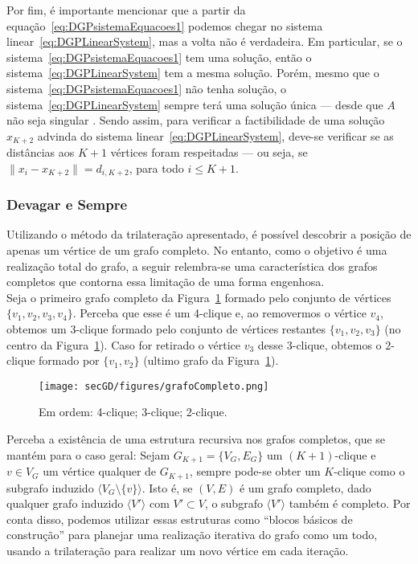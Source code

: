 Por fim, é importante mencionar que a partir da equação~\ref{eq:DGPsistemaEquacoes1} podemos chegar no sistema linear~\ref{eq:DGPLinearSystem}, mas a volta não é verdadeira. Em particular, se o sistema~\ref{eq:DGPsistemaEquacoes1} tem uma solução, então o sistema~\ref{eq:DGPLinearSystem} tem a mesma solução. Porém, mesmo que o sistema~\ref{eq:DGPsistemaEquacoes1} não tenha solução, o sistema~\ref{eq:DGPLinearSystem} sempre terá uma solução única --- desde que $A$ não seja singular \cite{libertiEDG}. Sendo assim, para verificar a factibilidade de uma solução $x_{K+2}$ advinda do sistema linear~\ref{eq:DGPLinearSystem}, deve-se verificar se as distâncias aos $K+1$ vértices foram respeitadas --- ou seja, se $\lVert x_i -x_{K+2} \rVert = d_{i,K+2}$, para todo $i\leq K+1$. 
\\

\subsubsection{Devagar e Sempre}

Utilizando o método da trilateração apresentado, é possível descobrir a posição de apenas um vértice de um grafo completo. No entanto, como o objetivo é uma realização total do grafo, a seguir relembra-se uma característica dos grafos completos que contorna essa limitação de uma forma engenhosa.
\\

Seja o primeiro grafo completo da Figura~\ref{fig:grafoCompleto} formado pelo conjunto de vértices $\{v_1,v_2,v_3,v_4\}$. Perceba que esse é um 4-clique e, ao removermos o vértice $v_4$, obtemos um $3$-clique formado pelo conjunto de vértices restantes $\{v_1,v_2,v_3\}$ (no centro da Figura~\ref{fig:grafoCompleto}). Caso for retirado o vértice $v_3$ desse 3-clique, obtemos o 2-clique formado por $\{v_1, v_2\}$ (ultimo grafo da Figura~\ref{fig:grafoCompleto}). 

\begin{figure}[H]
	\begin{center}
		\texttt{[image: secGD/figures/grafoCompleto.png]}
	\end{center}
	\caption{Em ordem: 4-clique; 3-clique; 2-clique.}
	\label{fig:grafoCompleto}
\end{figure}

Perceba a existência de uma estrutura recursiva nos grafos completos, que se mantém para o caso geral: Sejam $G_{K+1} = \{V_G, E_G\}$ um $(K+1)$-clique e $v \in V_G$ um vértice qualquer de $G_{K+1}$, sempre pode-se obter um $K$-clique como o subgrafo induzido $\langle V_G \setminus \{v\}\rangle$. Isto é, se $(V,E)$ é um grafo completo, dado qualquer grafo induzido $\langle V'\rangle$ com $V'\subset V$, o subgrafo $\langle V' \rangle$ também é completo. Por conta disso, podemos utilizar essas estruturas como ``blocos básicos de construção'' para planejar uma realização iterativa do grafo como um todo, usando a trilateração para realizar um novo vértice em cada iteração. 




